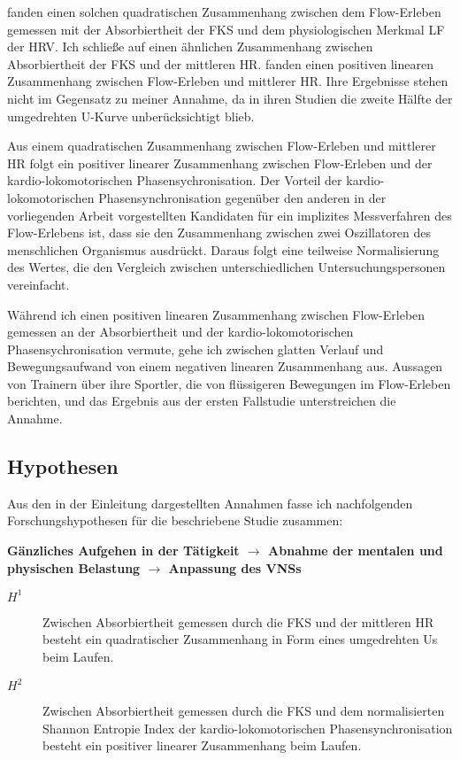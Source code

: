 \citet{Peifer2014} fanden einen solchen quadratischen Zusammenhang zwischen dem Flow-Erleben gemessen mit der Absorbiertheit der \ac{FKS} und dem physiologischen Merkmal \ac{LF} der \ac{HRV}. Ich schließe auf einen ähnlichen Zusammenhang zwischen Absorbiertheit der \ac{FKS} und der mittleren \ac{HR}. \citet{deManzano2010, Gaggioli2013} fanden einen positiven linearen Zusammenhang zwischen Flow-Erleben und mittlerer \ac{HR}. Ihre Ergebnisse stehen nicht im Gegensatz zu meiner Annahme, da in ihren Studien die zweite Hälfte der umgedrehten U-Kurve unberücksichtigt blieb.

Aus einem quadratischen Zusammenhang zwischen Flow-Erleben und mittlerer \ac{HR} folgt ein positiver linearer Zusammenhang zwischen Flow-Erleben und der kardio-lokomotorischen Phasensychronisation. Der Vorteil der kardio-lokomotorischen Phasensynchronisation gegenüber den anderen in der vorliegenden Arbeit vorgestellten Kandidaten für ein implizites Messverfahren des Flow-Erlebens ist, dass sie den Zusammenhang zwischen zwei Oszillatoren des menschlichen Organismus ausdrückt. Daraus folgt eine teilweise Normalisierung des Wertes, die den Vergleich zwischen unterschiedlichen Untersuchungspersonen vereinfacht.

Während ich einen positiven linearen Zusammenhang zwischen Flow-Erleben gemessen an der Absorbiertheit und der kardio-lokomotorischen Phasensychronisation vermute, gehe ich zwischen glatten Verlauf und Bewegungsaufwand von einem negativen linearen Zusammenhang aus. Aussagen von Trainern über ihre Sportler, die von flüssigeren Bewegungen im Flow-Erleben berichten, und das Ergebnis aus der ersten Fallstudie unterstreichen die Annahme.

\subsection{Hypothesen}
Aus den in der Einleitung dargestellten Annahmen fasse ich nachfolgenden Forschungshypothesen für die beschriebene Studie zusammen:

\textbf{Gänzliches Aufgehen in der Tätigkeit $\rightarrow$ Abnahme der mentalen und physischen Belastung $\rightarrow$ Anpassung des VNSs}
\begin{description}
	\item[$H^1$] Zwischen Absorbiertheit gemessen durch die \ac{FKS} und der mittleren \ac{HR} besteht ein quadratischer Zusammenhang in Form eines umgedrehten Us beim Laufen.
	\item[$H^2$] Zwischen Absorbiertheit gemessen durch die \ac{FKS} und dem normalisierten Shannon Entropie Index der kardio-lokomotorischen Phasensynchronisation besteht ein positiver linearer Zusammenhang beim Laufen.
\end{description}


